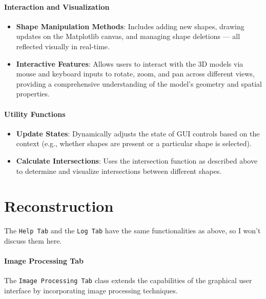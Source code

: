 \documentclass[../main.tex]{subfiles}
\begin{document}
\paragraph{Interaction and Visualization}
\begin{itemize}
    \setlength{\itemsep}{0.1mm}
    \item \textbf{Shape Manipulation Methods}: Includes adding new shapes, drawing updates on the Matplotlib canvas, and managing shape deletions — all reflected visually in real-time.
    \item \textbf{Interactive Features}: Allows users to interact with the 3D models via mouse and keyboard inputs to rotate, zoom, and pan across different views, providing a comprehensive understanding of the model's geometry and spatial properties.
\end{itemize}
\vspace{-15pt}
\paragraph{Utility Functions}
\begin{itemize}
    \item \textbf{Update States}: Dynamically adjusts the state of GUI controls based on the context (e.g., whether shapes are present or a particular shape is selected).
    \item \textbf{Calculate Intersections}: Uses the intersection function as described above to determine and visualize intersections between different shapes.
\end{itemize}
\vspace{-15pt}
\section{Reconstruction}
\vspace{-8pt}
The \texttt{Help Tab} and the \texttt{Log Tab} have the same functionalities as above, so I won't discuss them here.
\vspace{-15pt}
\paragraph{Image Processing Tab}
The \texttt{Image Processing Tab} class extends the capabilities of the graphical user interface by incorporating image processing techniques.
\end{document}
